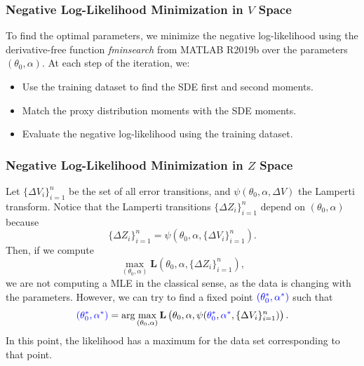 \documentclass[11pt]{article}
\theoremstyle{definition}
\begin{document}
\subsubsection{Negative Log-Likelihood Minimization in $V$ Space} \label{Sec:MinLH}

To find the optimal parameters, we minimize the negative log-likelihood using the derivative-free function \textit{fminsearch} from MATLAB R2019b over the parameters $(\theta_0,\alpha)$. At each step of the iteration,  we:
\begin{itemize}

\item Use the training dataset to find the SDE first and second moments.
\item Match the proxy distribution moments with the SDE moments.
\item Evaluate the negative log-likelihood using the training dataset.

\end{itemize}

\subsubsection{Negative Log-Likelihood Minimization in $Z$ Space} \label{Sec:MinLHL}

Let $\{\Delta V_i\}_{i=1}^n$ be the set of all error transitions, and $\psi(\theta_0,\alpha,\Delta V)$ the Lamperti transform. Notice that the Lamperti transitions $\{\Delta Z_i\}_{i=1}^n$ depend on $(\theta_0,\alpha)$ because $$\{\Delta Z_i\}_{i=1}^n=\psi(\theta_0,\alpha,\{\Delta V_i\}_{i=1}^n).$$
Then, if we compute $$\max_{(\theta_0,\alpha)}\mathbf{L}(\theta_0,\alpha,\{\Delta Z_i\}_{i=1}^n),$$
we are not computing a MLE in the classical sense, as the data is changing with the parameters. However, we can try to find a fixed point ${\color{blue}(\theta_0^*,\alpha^*)}$ such that
\begin{equation}
{\color{blue}(\theta_0^*,\alpha^*)}=\arg\max_{(\theta_0,\alpha)}\mathbf{L}\left(\theta_0,\alpha,\psi({\color{blue}\theta_0^*},{\color{blue}\alpha^*},\{\Delta V_i\}_{i=1}^n)\right).
\label{FP}
\end{equation}
In this point, the likelihood has a maximum for the data set corresponding to that point.
\end{document}
